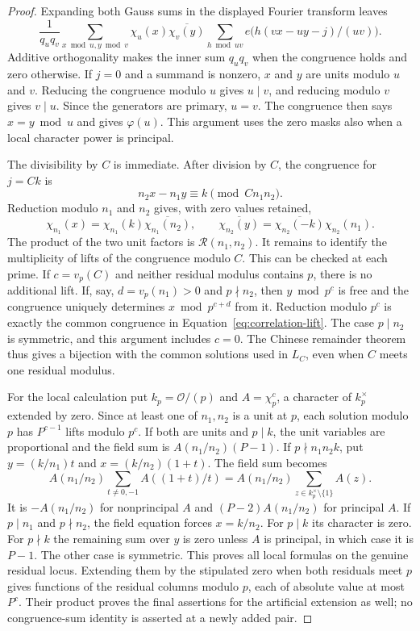 \documentclass[12pt]{article}
\begin{document}
\begin{proof}
Expanding both Gauss sums in the displayed Fourier transform leaves
\[
 \frac1{q_uq_v}\sum_{x\bmod u,y\bmod v}\chi_u(x)\overline{\chi_v(y)}
 \sum_{h\bmod uv}e\bigl(h(vx-uy-j)/(uv)\bigr).
\]
Additive orthogonality makes the inner sum $q_uq_v$ when the congruence holds
and zero otherwise.  If $j=0$ and a summand is nonzero, $x$ and $y$ are units
modulo $u$ and $v$.  Reducing the congruence modulo $u$ gives $u\mid v$, and
reducing modulo $v$ gives $v\mid u$.  Since the generators are primary,
$u=v$.  The congruence then says $x=y\bmod u$ and gives $\varphi(u)$.  This
argument uses the zero masks also when a local character power is principal.

The divisibility by $C$ is immediate.  After division by $C$, the congruence
for $j=Ck$ is
\[
 n_2x-n_1y\equiv k\pmod{Cn_1n_2}.
\]
Reduction modulo $n_1$ and $n_2$ gives, with zero values retained,
\[
 \chi_{n_1}(x)=\chi_{n_1}(k)\overline{\chi_{n_1}(n_2)},\qquad
 \overline{\chi_{n_2}(y)}
 =\overline{\chi_{n_2}(-k)}\chi_{n_2}(n_1).
\]
The product of the two unit factors is $\mathcal R(n_1,n_2)$.
It remains to identify the multiplicity of lifts of the congruence modulo
$C$.  This can be checked at each prime.  If $c=v_p(C)$ and neither residual
modulus contains $p$, there is no additional lift.  If, say,
$d=v_p(n_1)>0$ and $p\nmid n_2$, then $y\bmod p^c$ is free and the congruence
uniquely determines $x\bmod p^{c+d}$ from it.  Reduction modulo $p^c$ is
exactly the common congruence in Equation~\eqref{eq:correlation-lift}.
The case $p\mid n_2$ is symmetric, and this argument includes $c=0$.
The Chinese remainder theorem thus gives a bijection with the common
solutions used in $L_C$, even when $C$ meets one residual modulus.

For the local calculation put $k_p=\mathcal O/(p)$ and $A=\chi_p^c$, a
character of $k_p^\times$ extended by zero.  Since at least one of
$n_1,n_2$ is a unit at $p$, each
solution modulo $p$ has $P^{c-1}$ lifts modulo $p^c$.  If both are units and
$p\mid k$, the unit variables are proportional and the field sum is
$A(n_1/n_2)(P-1)$.  If $p\nmid n_1n_2k$, put
$y=(k/n_1)t$ and $x=(k/n_2)(1+t)$.  The field sum becomes
\[
 A(n_1/n_2)\sum_{t\ne0,-1}A((1+t)/t)
 =A(n_1/n_2)\sum_{z\in k_p^\times\setminus\{1\}}A(z).
\]
It is $-A(n_1/n_2)$ for nonprincipal $A$ and
$(P-2)A(n_1/n_2)$ for principal $A$.  If $p\mid n_1$ and $p\nmid n_2$, the
field equation forces $x=k/n_2$.  For $p\mid k$ its character is zero.  For
$p\nmid k$ the remaining sum over $y$ is zero unless $A$ is principal, in
which case it is $P-1$.  The other case is symmetric.  This proves all local
formulas on the genuine residual locus.  Extending them by the stipulated
zero when both residuals meet $p$ gives functions of the residual columns
modulo $p$, each of absolute value at most $P^c$.  Their product proves the
final assertions for the artificial extension as well; no congruence-sum
identity is asserted at a newly added pair.
\end{proof}
\end{document}
